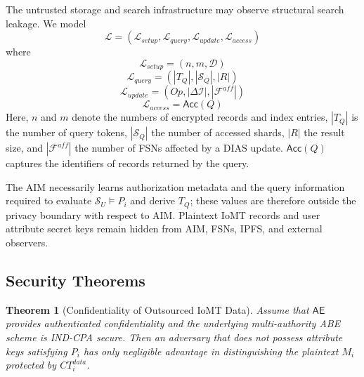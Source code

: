 \documentclass{ieeetj}
\theoremstyle{ieee-style}
\newtheorem{theorem}{Theorem}[subsection]
\begin{document}
The untrusted storage and search infrastructure may observe structural
search leakage. We model
\begin{equation}
\mathcal{L}
=
(\mathcal{L}_{setup},
 \mathcal{L}_{query},
 \mathcal{L}_{update},
 \mathcal{L}_{access})
\end{equation}
where
\begin{equation}
\mathcal{L}_{setup}
=(n,m,\mathcal{D})
\end{equation}
\begin{equation}
\mathcal{L}_{query}
=(|T_Q|,|\mathcal{S}_Q|,|R|)
\end{equation}
\begin{equation}
\mathcal{L}_{update}
=(Op,|\Delta\mathcal{I}|,|\mathcal{F}^{aff}|)
\end{equation}
\begin{equation}
\mathcal{L}_{access}
=\mathsf{Acc}(Q)
\end{equation}
Here, $n$ and $m$ denote the numbers of encrypted records and index
entries, $|T_Q|$ is the number of query tokens, $|\mathcal{S}_Q|$ the
number of accessed shards, $|R|$ the result size, and
$|\mathcal{F}^{aff}|$ the number of FSNs affected by a DIAS update.
$\mathsf{Acc}(Q)$ captures the identifiers of records returned by the
query.

The AIM necessarily learns authorization metadata and the query
information required to evaluate $\mathcal{S}_U\models P_i$ and derive
$T_Q$; these values are therefore outside the privacy boundary with
respect to AIM. Plaintext IoMT records and user attribute secret keys
remain hidden from AIM, FSNs, IPFS, and external observers.


\subsection{Security Theorems}

\begin{theorem}[Confidentiality of Outsourced IoMT Data]
Assume that $\mathsf{AE}$ provides authenticated confidentiality and the
underlying multi-authority ABE scheme is IND-CPA secure. Then an
adversary that does not possess attribute keys satisfying $P_i$ has only
negligible advantage in distinguishing the plaintext $M_i$ protected by
$CT_i^{data}$.
\end{theorem}
\end{document}
